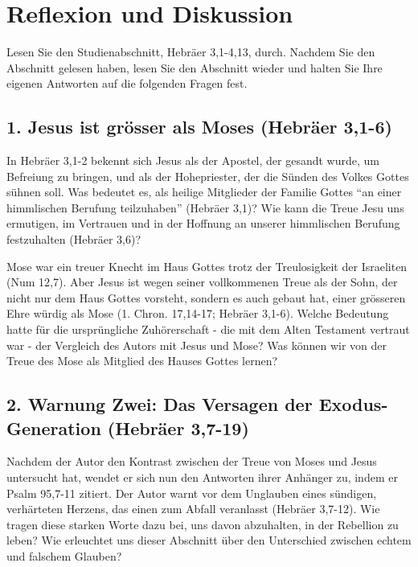 \documentclass[headsepline=true]{book}
\begin{document}
\section{Reflexion und Diskussion}\label{reflexion-und-diskussion-2}

Lesen Sie den Studienabschnitt, Hebräer 3,1-4,13, durch. Nachdem Sie den
Abschnitt gelesen haben, lesen Sie den Abschnitt wieder und halten Sie
Ihre eigenen Antworten auf die folgenden Fragen fest.

\subsection{1. Jesus ist grösser als Moses (Hebräer
3,1-6)}\label{jesus-ist-gruxf6sser-als-moses-hebruxe4er-31-6}

In Hebräer 3,1-2 bekennt sich Jesus als der Apostel, der gesandt wurde,
um Befreiung zu bringen, und als der Hohepriester, der die Sünden des
Volkes Gottes sühnen soll. Was bedeutet es, als heilige Mitglieder der
Familie Gottes ``an einer himmlischen Berufung teilzuhaben'' (Hebräer
3,1)? Wie kann die Treue Jesu uns ermutigen, im Vertrauen und in der
Hoffnung an unserer himmlischen Berufung festzuhalten (Hebräer 3,6)?

Mose war ein treuer Knecht im Haus Gottes trotz der Treulosigkeit der
Israeliten (Num 12,7). Aber Jesus ist wegen seiner vollkommenen Treue
als der Sohn, der nicht nur dem Haus Gottes vorsteht, sondern es auch
gebaut hat, einer grösseren Ehre würdig als Mose (1. Chron. 17,14-17;
Hebräer 3,1-6). Welche Bedeutung hatte für die ursprüngliche
Zuhörerschaft - die mit dem Alten Testament vertraut war - der Vergleich
des Autors mit Jesus und Mose? Was können wir von der Treue des Mose als
Mitglied des Hauses Gottes lernen?

\subsection{2. Warnung Zwei: Das Versagen der Exodus-Generation (Hebräer
3,7-19)}\label{warnung-zwei-das-versagen-der-exodus-generation-hebruxe4er-37-19}

Nachdem der Autor den Kontrast zwischen der Treue von Moses und Jesus
untersucht hat, wendet er sich nun den Antworten ihrer Anhänger zu,
indem er Psalm 95,7-11 zitiert. Der Autor warnt vor dem Unglauben eines
sündigen, verhärteten Herzens, das einen zum Abfall veranlasst (Hebräer
3,7-12). Wie tragen diese starken Worte dazu bei, uns davon abzuhalten,
in der Rebellion zu leben? Wie erleuchtet uns dieser Abschnitt über den
Unterschied zwischen echtem und falschem Glauben?
\end{document}
